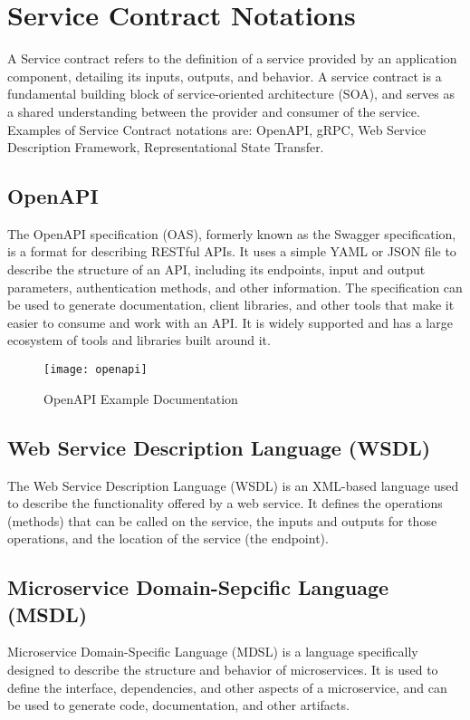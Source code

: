 \section{Service Contract Notations}
A Service contract refers to the definition of a service provided by an application component, detailing its inputs, outputs, and behavior. A service contract is a fundamental building block of service-oriented architecture (SOA), and serves as a shared understanding between the provider and consumer of the service. Examples of Service Contract notations are: OpenAPI, gRPC, Web Service Description Framework, Representational State Transfer.

\subsection{OpenAPI}
The OpenAPI specification (OAS), formerly known as the Swagger specification, is a format for describing RESTful APIs. It uses a simple YAML or JSON file to describe the structure of an API, including its endpoints, input and output parameters, authentication methods, and other information. The specification can be used to generate documentation, client libraries, and other tools that make it easier to consume and work with an API. It is widely supported and has a large ecosystem of tools and libraries built around it.

\begin{figure}[H]
  \center
  \texttt{[image: openapi]}
  \caption{OpenAPI Example Documentation}
\end{figure}

\subsection{Web Service Description Language (WSDL)}
The Web Service Description Language (WSDL) is an XML-based language used to describe the functionality offered by a web service. It defines the operations (methods) that can be called on the service, the inputs and outputs for those operations, and the location of the service (the endpoint).

\subsection{Microservice Domain-Sepcific Language (MSDL)}
Microservice Domain-Specific Language (MDSL) is a language specifically designed to describe the structure and behavior of microservices. It is used to define the interface, dependencies, and other aspects of a microservice, and can be used to generate code, documentation, and other artifacts.

